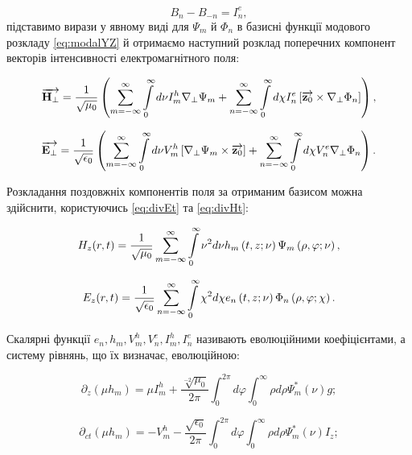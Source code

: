 \begin{equation}
B_n - B_{-n} = I_n^e,
\end{equation}
%
підставимо вирази у явному виді для $ \Psi_m $ й $ \Phi_n $ в базисні 
функції модового розкладу \eqref{eq:modalYZ} й отримаємо 
наступний розклад поперечних 
компонент векторів інтенсивності електромагнітного поля:

\begin{equation}
\overrightarrow{\mathbf H_\perp} = \frac{1}{\sqrt{\mu_0}} \left( 
\sum \limits_{m=-\infty}^{\infty} \int \limits_{0}^{\infty} d \nu
I_m^h \nabla_\perp \Psi_m + \sum \limits_{n=-\infty}^{\infty}
\int \limits_{0}^{\infty} d \chi I_n^e 
\left[ \overrightarrow{\mathbf z_0} \times \nabla_\perp \Phi_n \right] \right),
\end{equation}

\begin{equation} 
\overrightarrow{\mathbf E_\perp} = \frac{1}{\sqrt{\epsilon_0}} \left( 
\sum \limits_{m=-\infty}^{\infty} \int \limits_{0}^{\infty} 
d \nu V_m^h \left[  \nabla_\perp \Psi_m  \times  \overrightarrow{\mathbf z_0}  \right] +
\sum \limits_{n=-\infty}^{\infty} \int \limits_{0}^{\infty}
d \chi V_n^e \nabla_\perp \Phi_n \right).
\end{equation}

Розкладання поздовжніх компонентів поля за отриманим базисом 
можна здійснити,
користуючись \eqref{eq:divEt} та \eqref{eq:divHt}:

\begin{equation} 
H_z (r,t) = \frac{1}{\sqrt{\mu_0}} \sum \limits_{m=-\infty}^\infty
\int \limits_0^\infty \nu^2 d \nu 
h_m \left( t, z; \nu \right) \Psi_m \left( \rho, \varphi; \nu \right),
\end{equation}

\begin{equation} 
E_z (r,t) = \frac{1}{\sqrt{\epsilon_0}} \sum \limits_{n=-\infty}^\infty
\int \limits_0^\infty \chi^2 d \chi 
e_n \left( t, z; \nu \right)  \Phi_n \left( \rho, \varphi; \chi \right).
\end{equation}

Скалярні функції $ e_n, h_m, V_m^h, V_n^e, I_m^h, I_n^e  $ називають 
еволюційними коефіцієнтами, а систему рівнянь, що їх визначає, 
еволюційною:

\begin{equation} \label{eq:evo1}
\partial_z (\mu h_m) = \mu I_m^h + \frac{\sqrt[-2]{\mu_0}}{2 \pi}
\int_0^{2\pi} d \varphi \int_0^{\infty} \rho d \rho
\Psi_m^* (\nu) g;
\end{equation}

\begin{equation} \label{eq:evo2}
\partial_{ct} (\mu h_m) = - V_m^h - \frac{\sqrt{\epsilon_0}}{2 \pi}
\int_0^{2\pi} d \varphi \int_0^{\infty} \rho d \rho
\Psi_m^* (\nu) I_z;
\end{equation}

